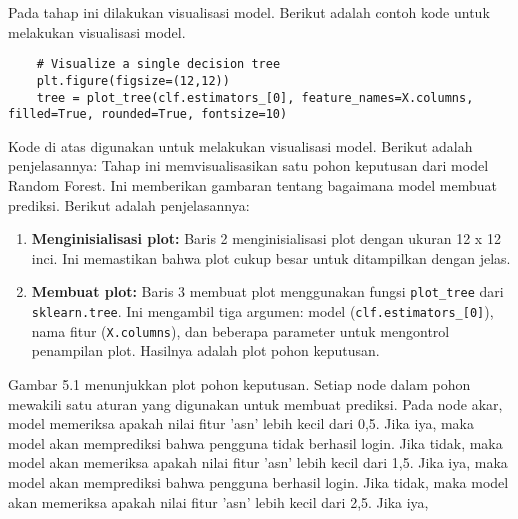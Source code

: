 Pada tahap ini dilakukan visualisasi model. Berikut adalah contoh kode untuk melakukan visualisasi model.
\begin{lstlisting}
    # Visualize a single decision tree
    plt.figure(figsize=(12,12))
    tree = plot_tree(clf.estimators_[0], feature_names=X.columns, filled=True, rounded=True, fontsize=10)
    \end{lstlisting}

    Kode di atas digunakan untuk melakukan visualisasi model. Berikut adalah penjelasannya:
    Tahap ini memvisualisasikan satu pohon keputusan dari model Random Forest. Ini memberikan gambaran tentang bagaimana model membuat prediksi. Berikut adalah penjelasannya:

    \begin{enumerate}
    \item \textbf{Menginisialisasi plot:} Baris 2 menginisialisasi plot dengan ukuran 12 x 12 inci. Ini memastikan bahwa plot cukup besar untuk ditampilkan dengan jelas.
    \item \textbf{Membuat plot:} Baris 3 membuat plot menggunakan fungsi \texttt{plot\_tree} dari \texttt{sklearn.tree}. Ini mengambil tiga argumen: model (\texttt{clf.estimators\_[0]}), nama fitur (\texttt{X.columns}), dan beberapa parameter untuk mengontrol penampilan plot. Hasilnya adalah plot pohon keputusan.
    \end{enumerate}


        Gambar 5.1 menunjukkan plot pohon keputusan. Setiap node dalam pohon mewakili satu aturan yang digunakan untuk membuat prediksi. Pada node akar, model memeriksa apakah nilai fitur 'asn' lebih kecil dari 0,5. Jika iya, maka model akan memprediksi bahwa pengguna tidak berhasil login. Jika tidak, maka model akan memeriksa apakah nilai fitur 'asn' lebih kecil dari 1,5. Jika iya, maka model akan memprediksi bahwa pengguna berhasil login. Jika tidak, maka model akan memeriksa apakah nilai fitur 'asn' lebih kecil dari 2,5. Jika iya,
  